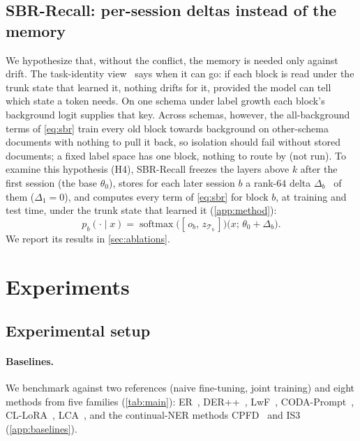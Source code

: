 \documentclass[10pt,twocolumn,letterpaper]{article}
\begin{document}
\subsection{SBR-Recall: per-session deltas instead of the memory}
\label{sec:recall}
We hypothesize that, without the conflict, the memory is needed only against drift. The task-identity view~\citep{kim2022theoretical} says when it can go: if each block is read under the trunk state that learned it, nothing drifts for it, provided the model can tell which state a token needs. On one schema under label growth each block's background logit supplies that key. Across schemas, however, the all-background terms of \cref{eq:sbr} train every old block towards background on other-schema documents with nothing to pull it back, so isolation should fail without stored documents; a fixed label space has one block, nothing to route by (not run). To examine this hypothesis (H4), SBR-Recall freezes the layers above $k$ after the first session (the base $\theta_0$), stores for each later session $b$ a rank-$64$ delta $\Delta_b$~\citep{hu2022lora} of them ($\Delta_1{=}0$), and computes every term of \cref{eq:sbr} for block $b$, at training and test time, under the trunk state that learned it (\cref{app:method}):
\begin{equation}
p_b(\cdot\mid x)=\operatorname{softmax}\big([\,o_b,\,z_{\mathcal{T}_b}\,]\big)\big(x;\,\theta_0+\Delta_b\big).
\label{eq:recall}
\end{equation}
We report its results in \cref{sec:ablations}.

\section{Experiments}
\label{sec:experiments}
\subsection{Experimental setup}
\paragraph{Baselines.} We benchmark against two references (naive fine-tuning, joint training) and eight methods from five families (\cref{tab:main}): ER~\citep{rolnick2019er}, DER++~\citep{buzzega2020der}, LwF~\citep{li2017lwf}, CODA-Prompt~\citep{smith2023coda}, CL-LoRA~\citep{he2025cllora}, LCA~\citep{lca2026}, and the continual-NER methods CPFD~\citep{zhang2023cpfd} and IS3~\citep{qiu2024is3} (\cref{app:baselines}).
\end{document}
